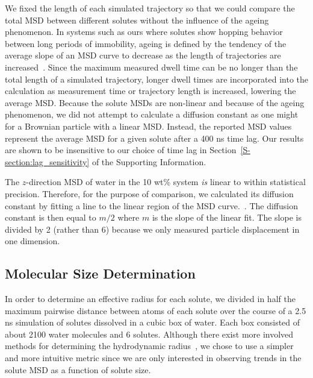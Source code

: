 \documentclass[journal=jpcbfk,manuscript=article]{achemso}
\begin{document}
  We fixed the length of each simulated trajectory so that we could compare the total
  MSD between different solutes without the influence of the ageing phenomenon.
  In systems such as ours where solutes show hopping behavior between long periods 
  of immobility, ageing is defined by the tendency of the average slope of an MSD 
  curve to decrease as the length of trajectories are increased~\cite{metzler_anomalous_2014}.
  Since the maximum measured dwell time can be no longer than the total length of a simulated
  trajectory, longer dwell times are incorporated into the calculation as measurement
  time or trajectory length is increased, lowering the average MSD. Because the solute 
  MSDs are non-linear and because of the ageing phenomenon, we did not attempt to calculate
  a diffusion constant as one might for a Brownian particle with a linear MSD. Instead,
  the reported MSD values represent the average MSD for a given	solute after a 400
  ns time lag. Our results are shown to be insensitive to our choice of time lag in 
  Section~\ref{S-section:lag_sensitivity} of the Supporting Information.
  
  The $z$-direction MSD of water in the 10 wt\% system \textit{is} linear
  to within statistical precision.
  Therefore, for
  the purpose of comparison, we calculated its diffusion constant by fitting a line
  to the linear region of the MSD curve.~\cite{maginn_best_2018}. The diffusion constant
  is then equal to $m/2$ where $m$ is the slope of the linear fit. The slope is divided
  by 2 (rather than 6) because we only measured particle displacement in one dimension.

  \subsection{Molecular Size Determination}\label{method:molecular_size}
  
  In order to determine an effective radius for each solute, we divided in 
  half the maximum pairwise distance between atoms of each solute over the course of
  a 2.5 ns simulation of solutes dissolved in a cubic box of water. Each box 
  consisted of about 2100 water molecules and 6 solutes. Although there exist
  more involved methods for determining the hydrodynamic radius~\cite{schultz_determination_1961},
  we chose to use a simpler and more intuitive metric since we are only interested
  in observing trends in the solute MSD as a function
  of solute size.
  
\end{document}
